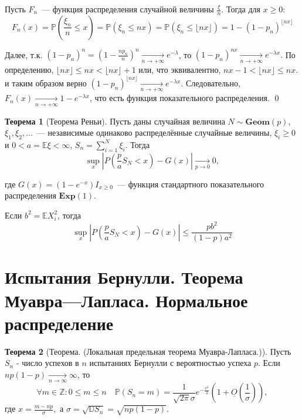 \documentclass[oneside,final,14pt]{extreport}
\renewenvironment{proof}{{\bfseries Доказательство.}}{\qed}
\theoremstyle{plain}
\theoremstyle{definition}
\theoremstyle{named}
\newtheorem*{namedthm}{Теорема}
\begin{document}
\begin{proof}
    Пусть $F_n$~--- функция распределения случайной величины $\frac{\xi}{n}$. Тогда для $x \geqslant 0$:
    \begin{equation*}
        F_{n}(x)=\mathbb{P}\left(\frac{\xi_{n}}{n} \leq x\right)=\mathbb{P}\left(\xi_{n} \leq n x\right)=\mathbb{P}\left(\xi_{n} \leq\lfloor n x\rfloor\right)=1-\left(1-p_{n}\right)^{\lfloor n x\rfloor}
    \end{equation*}
    
    Далее, т.к. $\left(1-p_{n}\right)^{n}=\left(1-\frac{n p_{n}}{n}\right)^{n} \xrightarrow[n \rightarrow +\infty]{} e^{-\lambda}$, то $(1 - p_n)^{nx} \xrightarrow[n \rightarrow +\infty]{} e^{-\lambda x}.$ По определению, $\lfloor n x\rfloor \leq n x<\lfloor n x\rfloor+1$ или, что эквивалентно, $n x-1<\lfloor n x\rfloor \leq n x.$ и таким образом верно $(1 - p_n)^{\lfloor nx \rfloor} \xrightarrow[n \rightarrow +\infty]{} e^{-\lambda x}$. Следовательно, $F_n(x) \xrightarrow[n \rightarrow +\infty]{} 1 - e^{-\lambda x}$, что есть функция показательного распределения. 
\end{proof}

\begin{namedthm}[Теорема Реньи]
Пусть даны случайная величина $N \sim \mathbf{Geom}(p)$, $\xi_1, \xi_2, ...$~--- независимые одинаково распределённые случайные величины, $\xi_i \geqslant 0$ и $0 < a = \mathbb{E}\xi < \infty$, $S_n = \sum\limits_{i=1}^N \xi_i$. Тогда
\begin{equation*}
    \sup _{x}\left|P\left(\frac{p}{a} S_{N}<x\right)-G(x)\right| \underset{p \rightarrow 0}{\longrightarrow} 0,
\end{equation*}

где $G(x)=\left(1-e^{-x}\right) I_{x \geqslant 0}$~--- функция стандартного показательного распределения $\mathbf{Exp}(1)$.

Если $b^2 = \mathbb{E}X_i^2$, тогда
\begin{equation*}
    \sup_{x}\left|P\left(\frac{p}{a} S_{N}<x\right)-G(x)\right| \leqslant \frac{p b^{2}}{(1-p) a^{2}}
\end{equation*}
\end{namedthm}

\section{Испытания Бернулли. Теорема Муавра—Лапласа. Нормальное распределение}

\begin{namedthm} [Теорема. (Локальная предельная теорема Муавра-Лапласа.)]
    Пусть $S_n$ - число успехов в $n$ испытаниях Бернулли с вероятностью успеха $p$. Если $n p(1-p) \underset{n \to \infty}{\longrightarrow} \infty$, то
$$\forall m \in \mathbb{Z}: 0 \leqslant m \leqslant n \quad \mathbb{P}\left(S_{n}=m\right)=\frac{1}{\sqrt{2 \pi} \sigma} e^{-\frac{x^{2}}{2}}\left(1+\underline{O}\left(\frac{1}{\sigma}\right)\right),$$
где $x = \frac{m - np}{\sigma},$ а $\sigma=\sqrt{\mathbb{D} S_{n}}=\sqrt{n p(1-p)}$.
\end{namedthm}  
\end{document}
